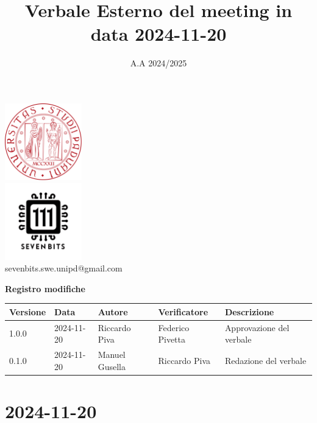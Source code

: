 \documentclass[12pt]{article}
\title{Verbale Esterno del meeting in data 2024-11-20}
\date{A.A 2024/2025}
\begin{document}
\maketitle
\begin{center}
\includegraphics[width=0.25\textwidth]{LogoUnipd}\\
\includegraphics[width=0.25\textwidth]{Sevenbitslogo}\\
sevenbits.swe.unipd@gmail.com\\
\vspace{2mm}

\textbf{Registro modifiche}\\
\vspace{2mm}
\begin{tabularx}{\textwidth}{|l|l|l|l|X|}
\hline
\textbf{Versione} & \textbf{Data} & \textbf{Autore} & \textbf{Verificatore} & \textbf{Descrizione} \\
\hline
1.0.0 & 2024-11-20 & Riccardo Piva & Federico Pivetta & Approvazione del verbale\\
\hline
0.1.0 & 2024-11-20 & Manuel Gusella & Riccardo Piva & Redazione del verbale\\
\hline

\end{tabularx}
\end{center}
\newpage
\tableofcontents
\newpage
\section{2024-11-20}
\end{document}
